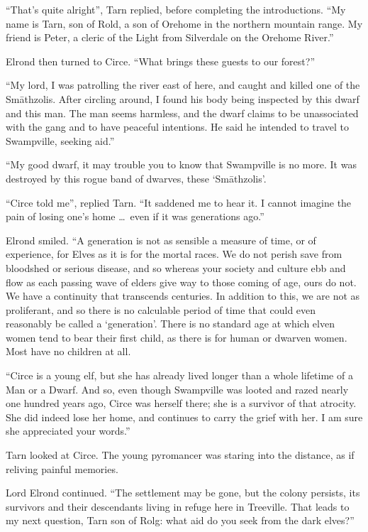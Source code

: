 ``That's quite alright'', Tarn replied, before completing the introductions.  ``My name is Tarn, son of Rold, a son of Orehome in the northern mountain range.  My friend is Peter, a cleric of the Light from Silverdale on the Orehome River.''

Elrond then turned to Circe. ``What brings these guests to our forest?''

``My lord, I was patrolling the river east of here, and caught and killed one of the Sm\=athzolis.  After circling around, I found his body being inspected by this dwarf and this man.  The man seems harmless, and the dwarf claims to be unassociated with the gang and to have peaceful intentions.  He said he intended to travel to Swampville, seeking aid.''

``My good dwarf, it may trouble you to know that Swampville is no more.  It was destroyed by this rogue band of dwarves, these `Sm\=athzolis'.

``Circe told me'', replied Tarn.  ``It saddened me to hear it.  I cannot imagine the pain of losing one's home \ldots\ even if it was generations ago.''

Elrond smiled.  ``A generation is not as sensible a measure of time, or of experience, for Elves as it is for the mortal races.  We do not perish save from bloodshed or serious disease, and so whereas your society and culture ebb and flow as each passing wave of elders give way to those coming of age, ours do not.  We have a continuity that transcends centuries.  In addition to this, we are not as proliferant, and so there is no calculable period of time that could even reasonably be called a `generation'.  There is no standard age at which elven women tend to bear their first child, as there is for human or dwarven women.  Most have no children at all.

``Circe is a young elf, but she has already lived longer than a whole lifetime of a Man or a Dwarf.  And so, even though Swampville was looted and razed nearly one hundred years ago, Circe was herself there; she is a survivor of that atrocity.  She did indeed lose her home, and continues to carry the grief with her.  I am sure she appreciated your words.''

Tarn looked at Circe.  The young pyromancer was staring into the distance, as if reliving painful memories.

Lord Elrond continued.  ``The settlement may be gone, but the colony persists, its survivors and their descendants living in refuge here in Treeville.  That leads to my next question, Tarn son of Rolg: what aid do you seek from the dark elves?''

